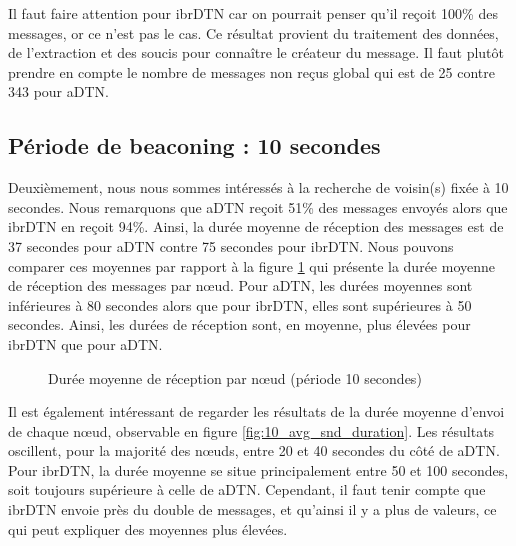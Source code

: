 \documentclass[a4paper,10pt]{article}
\begin{document}
Il faut faire attention pour ibrDTN car on pourrait penser qu’il reçoit 100\% des messages, or ce n’est pas le cas. Ce résultat provient du traitement des données, de l'extraction et des soucis pour connaître le créateur du message. Il faut plutôt prendre en compte le nombre de messages non reçus global qui est de 25 contre 343 pour aDTN.\par


\subsection {Période de beaconing : 10 secondes}
Deuxièmement, nous nous sommes intéressés à la recherche de voisin(s) fixée à 10 secondes. Nous remarquons que aDTN reçoit 51\% des messages envoyés alors que ibrDTN en reçoit 94\%. Ainsi, la durée moyenne de réception des messages est de 37 secondes pour aDTN contre 75 secondes pour ibrDTN. Nous pouvons comparer ces moyennes par rapport à la figure \ref{fig:10_avg_rcv_duration} qui présente la durée moyenne de réception des messages par nœud. Pour aDTN, les durées moyennes sont inférieures à 80 secondes alors que pour ibrDTN, elles sont supérieures à 50 secondes. Ainsi, les durées de réception sont, en moyenne, plus élevées pour ibrDTN que pour aDTN.\par

\begin{figure}[h!]
    \centering
    \caption{Durée moyenne de réception par nœud (période 10 secondes)}
    \label{fig:10_avg_rcv_duration}
\end{figure}

Il est également intéressant de regarder les résultats de la durée moyenne d'envoi de chaque nœud, observable en figure \ref{fig:10_avg_snd_duration}. Les résultats oscillent, pour la majorité des nœuds, entre 20 et 40 secondes du côté de aDTN. Pour ibrDTN, la durée moyenne se situe principalement entre 50 et 100 secondes, soit toujours supérieure à celle de aDTN. Cependant, il faut tenir compte que ibrDTN envoie près du double de messages, et qu’ainsi il y a plus de valeurs, ce qui peut expliquer des moyennes plus élevées. \par
\end{document}
